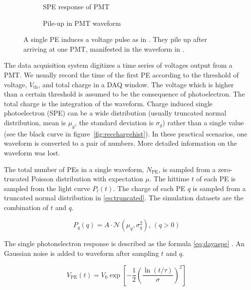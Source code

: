 \begin{figure}[H]
  \begin{subfigure}{.49\textwidth}
    \centering
    \resizebox{\textwidth}{!}{}
    \caption{\label{fig:spe} SPE response of PMT}
  \end{subfigure}
  \begin{subfigure}{.49\textwidth}
    \centering
    \resizebox{\textwidth}{!}{}
    \caption{\label{fig:pile} Pile-up in PMT waveform}
  \end{subfigure}
  \caption{A single PE induces a voltage pulse as in .  They pile up after arriving at one PMT, manifested in the waveform in .}
\end{figure}

The data acquisition system digitizes a time series of voltages output from a PMT. We usually record the time of the first PE according to the threshold of voltage, $V_\mathrm{th}$, and total charge in a DAQ window. The voltage which is higher than a certain threshold is assumed to be the consequence of photoelectron. The total charge is the integration of the waveform. Charge induced single photoelectron (SPE) can be a wide distribution (usually truncated normal distribution, mean is $\mu_{g}$, the standard deviation is $\sigma_{g}$) rather than a single value (see the black curve in figure~\ref{fig:recchargehist}). In these practical scenarios, one waveform is converted to a pair of numbers. More detailed information on the waveform was lost. 


The total number of PEs in a single waveform, $N_\mathrm{PE}$, is sampled from a zero-trucated Poisson distribution with expectation $\mu$. The hittime $t$ of each PE is sampled from the light curve $P_{t}(t)$. The charge of each PE $q$ is sampled from a truncated normal distribution in \eqref{eq:truncated}. The simulation datasets are the combination of $t$ and $q$.

\begin{equation}
    P_{q}(q) = A\cdot\mathcal{N}(\mu_{q},\sigma_{q}^{2}),\,(q>0)
    \label{eq:truncated}
\end{equation}

The single photonelectron response is described as the formula \eqref{eq:dayaspe} \cite{jetter_pmt_2012}. An Gaussian noise is added to waveform after sampling $t$ and $q$. 

\begin{equation}
    V_\mathrm{PE}(t) = V_{0}\exp\left[-\frac{1}{2}\left(\frac{\ln(t/\tau)}{\sigma}\right)^{2}\right]
    \label{eq:dayaspe}
\end{equation}

